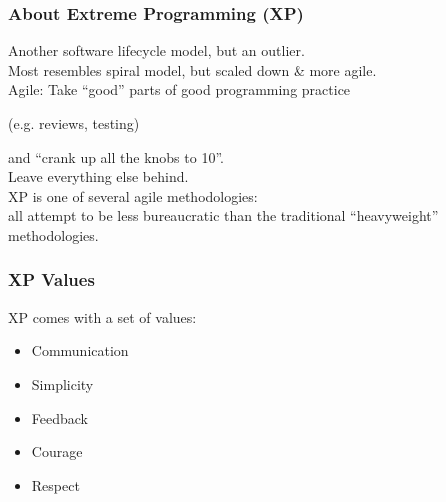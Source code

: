 \begin{frame}
\frametitle{About Extreme Programming (XP)}
\begin{changemargin}{2cm}
Another software lifecycle model, but an outlier.\\

Most resembles spiral model, but scaled down \& more agile.\\[1em]

Agile: Take ``good'' parts of good programming practice
\begin{center}
(e.g. reviews, testing)
\end{center}
and ``crank up all the knobs to 10''.\\[1em]

Leave everything else behind.\\[1em]

XP is one of several agile methodologies:\\
all attempt to be less bureaucratic than the traditional
``heavyweight'' methodologies. 

\end{changemargin}
\end{frame}


\begin{frame}
\frametitle{XP Values}
\begin{changemargin}{2cm}
XP comes with a set of values:
\begin{itemize}
\item Communication\\[2em]
\item Simplicity\\[2em]
\item Feedback\\[2em]
\item Courage\\[2em]
\item Respect\\[2em]
\end{itemize}
\end{changemargin}
\end{frame}

